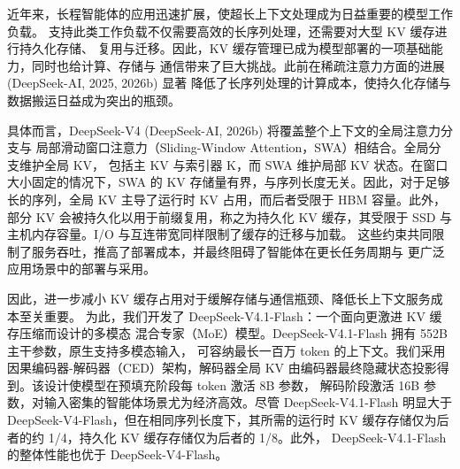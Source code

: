 \documentclass[
  10
]{article}
\begin{document}
近年来，长程智能体的应用迅速扩展，使超长上下文处理成为日益重要的模型工作负载。
支持此类工作负载不仅需要高效的长序列处理，还需要对大型 KV 缓存进行持久化存储、
复用与迁移。因此，KV 缓存管理已成为模型部署的一项基础能力，同时也给计算、存储与
通信带来了巨大挑战。此前在稀疏注意力方面的进展 (DeepSeek-AI, 2025, 2026b) 显著
降低了长序列处理的计算成本，使持久化存储与数据搬运日益成为突出的瓶颈。

具体而言，DeepSeek-V4 (DeepSeek-AI, 2026b) 将覆盖整个上下文的全局注意力分支与
局部滑动窗口注意力（Sliding-Window Attention，SWA）相结合。全局分支维护全局 KV，
包括主 KV 与索引器 K，而 SWA 维护局部 KV 状态。在窗口大小固定的情况下，SWA 的
KV 存储量有界，与序列长度无关。因此，对于足够长的序列，全局 KV 主导了运行时 KV
占用，而后者受限于 HBM 容量。此外，部分 KV 会被持久化以用于前缀复用，称之为持久化
KV 缓存，其受限于 SSD 与主机内存容量。I/O 与互连带宽同样限制了缓存的迁移与加载。
这些约束共同限制了服务吞吐，推高了部署成本，并最终阻碍了智能体在更长任务周期与
更广泛应用场景中的部署与采用。

因此，进一步减小 KV 缓存占用对于缓解存储与通信瓶颈、降低长上下文服务成本至关重要。
为此，我们开发了 DeepSeek-V4.1-Flash：一个面向更激进 KV 缓存压缩而设计的多模态
混合专家（MoE）模型。DeepSeek-V4.1-Flash 拥有 552B 主干参数，原生支持多模态输入，
可容纳最长一百万 token 的上下文。我们采用因果编码器-解码器（CED）架构，解码器全局
KV 由编码器最终隐藏状态投影得到。该设计使模型在预填充阶段每 token 激活 8B 参数，
解码阶段激活 16B 参数，对输入密集的智能体场景尤为经济高效。尽管
DeepSeek-V4.1-Flash 明显大于 DeepSeek-V4-Flash，但在相同序列长度下，其所需的运行时
KV 缓存存储仅为后者的约 1/4，持久化 KV 缓存存储仅为后者的 1/8。此外，
DeepSeek-V4.1-Flash 的整体性能也优于 DeepSeek-V4-Flash。
\end{document}
